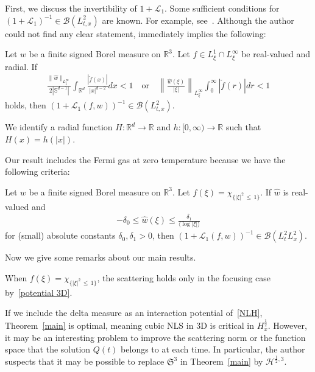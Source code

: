 \documentclass[AHL,Unicode,longabstracts,MathTools,published]{cedram}
\newcommand{\BR}{\mathbb{R}}
\newcommand{\BS}{\mathbb{S}}
\newcommand{\CB}{\mathcal{B}}
\newcommand{\CH}{\mathcal{H}}
\newcommand{\CL}{\mathcal{L}}
\newcommand{\FS}{\mathfrak{S}}
\newcommand{\de}{\delta}
\newcommand{\ch}{\chi}
\newcommand{\wh}{\widehat}
\newcommand{\Br}[1]{\langle #1 \rangle}
\renewcommand{\No}[1]{\left\| #1 \right\|}
\newcommand{\I}{\infty}
\newcommand{\R}{\mathbb{R}}
\newcommand{\tw}{\frac{1}{2}}
\begin{document}
First, we discuss the invertibility of $1+\CL_1$. Some sufficient conditions for $(1+\CL_1)^{-1} \in \CB(L^2_{t,x})$ are known. For example, see~\cite[Corollary~1]{2014LS}. Although the author could not find any clear statement, \cite[Proposition~1]{2014LS} immediately implies the following:

\begin{prop}
Let $w$ be a finite signed Borel measure on $\R^3$. Let $f \in L^1_\xi \cap L^\I_\xi$ be real-valued and radial. If
\begin{align}
\frac{\|\widehat{w}\|_{L^\I_\xi}}{2\left|\BS^{d-1}\right|} \int_{\BR^d} \frac{\left|\check{f}(x)\right|}{|x|^{d-2}} dx < 1
\quad \text{or}
\quad \No{\frac{\wh{w}(\xi)}{|\xi|}}_{L^\I_\xi} \int_0^\I \left|\check{f}(r)\right|dr < 1
\end{align}
holds, then $(1+\CL_1(f,w))^{-1} \in \CB(L^2_{t,x})$.
\end{prop}

\begin{rema}
We identify a radial function $H:\BR^d \to \BR$ and $h:[0,\I) \to \BR$ such that $H(x) = h(|x|)$.
\end{rema}

Our result includes the Fermi gas at zero temperature because we have the following criteria:

\begin{prop}[{\cite[Proposition~1.6]{2023H}}] \label{cor}
Let $w$ be a finite signed Borel measure on $\BR^3$. Let $f(\xi) = \ch_{\{|\xi|^2\,\le\,1\}}$. If $\wh{w}$ is real-valued and
\begin{align}\label{potential 3D}
-\de_0 \le \wh{w}(\xi) \le \frac{\de_1}{\Br{\log|\xi|}}
\end{align}
for (small) absolute constants $\de_0, \de_1 > 0$, then $(1+\CL_1(f,w))^{-1} \in \CB(L^2_t L^2_x)$.
\end{prop}

Now we give some remarks about our main results.

\begin{rema}
When $f(\xi) = \ch_{\{|\xi|^2\,\le\,1\}}$, the scattering holds only in the focusing case by~\eqref{potential 3D}.
\end{rema}

\begin{rema}
If we include the delta measure as an interaction potential of~\eqref{NLH}, Theorem~\ref{main} is optimal, meaning cubic NLS in 3D is critical in $H^\tw_x$. However, it may be an interesting problem to improve the scattering norm or the function space that the solution $Q(t)$ belongs to at each time. In particular, the author suspects that it may be possible to replace $\FS^3$ in Theorem~\ref{main} by $\CH^{\tw,3}$.
\end{rema}
\end{document}
